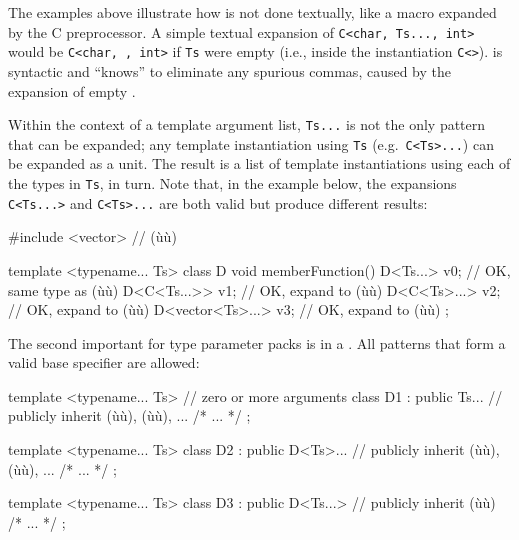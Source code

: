 \noindent The examples above illustrate how  is not done
textually, like a macro expanded by the C preprocessor. A simple textual
expansion of \lstinline!C<char,!~\lstinline!Ts...,!~\lstinline!int>! would be
\lstinline!C<char,!~\lstinline!,!~\lstinline!int>! if \lstinline!Ts! were empty
(i.e., inside the instantiation \lstinline!C<>!).  is syntactic and ``knows'' to eliminate any spurious commas,
caused by the expansion of empty .

Within the context of a template argument list, \lstinline!Ts...! is not
the only pattern that can be expanded; any template instantiation using
\lstinline!Ts! (e.g.~\lstinline!C<Ts>...!) can be expanded as a unit. The
result is a list of template instantiations using each of the types in
\lstinline!Ts!, in turn. Note that, in the example below, the expansions
\lstinline!C<Ts...>! and \lstinline!C<Ts>...! are both valid but produce
different results:

\begin{emcppslisting}
#include <vector>  // (ù{}ù)

template <typename... Ts> class D
{
    void memberFunction()
    {
        D<Ts...> v0;          // OK, same type as (ù{}ù)
        D<C<Ts...>> v1;       // OK, expand to (ù{}ù)
        D<C<Ts>...>  v2;      // OK, expand to (ù{}ù)
        D<vector<Ts>...> v3;  // OK, expand to (ù{}ù)
    }
};
\end{emcppslisting}
    

\noindent The second important  for type
parameter packs is in a . All patterns that
form a valid base specifier are allowed:

\begin{emcppslisting}
template <typename... Ts>   // zero or more arguments
class D1 : public Ts...     // publicly inherit (ù{}ù), (ù{}ù), ...
{ /* ... */ };

template <typename... Ts>
class D2 : public D<Ts>...  // publicly inherit (ù{}ù), (ù{}ù), ...
{ /* ... */ };

template <typename... Ts>
class D3 : public D<Ts...>  // publicly inherit (ù{}ù)
{ /* ... */ };
\end{emcppslisting}
    

